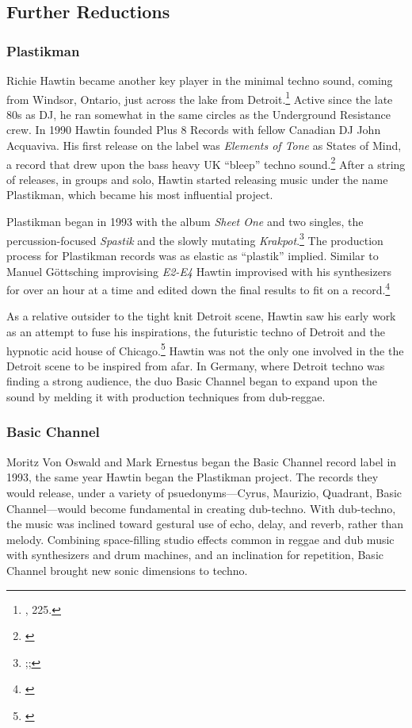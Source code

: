 \documentclass[12pt,twoside]{reedthesis}
\begin{document}
\subsection{Further Reductions}

\subsubsection{Plastikman}

Richie Hawtin became another key player in the minimal techno sound, coming from Windsor, Ontario, just across the lake from Detroit.\footnote{\cite{reynoldsGenerationEcstasyWorld1998}, 225.} Active since the late 80s as DJ, he ran somewhat in the same circles as the Underground Resistance crew. In 1990 Hawtin founded Plus 8 Records with fellow Canadian DJ John Acquaviva. His first release on the label was \emph{Elements of Tone} as States of Mind, a record that drew upon the bass heavy UK ``bleep'' techno sound.\footnote{\cite{statesofmindElementsTone1990}} After a string of releases, in groups and solo, Hawtin started releasing music under the name Plastikman, which became his most influential project.

Plastikman began in 1993 with the album \emph{Sheet One} and two singles, the percussion-focused \emph{Spastik} and the slowly mutating \emph{Krakpot}.\footnote{\cite{plastikmanSheetOne1993};\cite{plastikmanSpastik1993};\cite{plastikmanKrakpot1993}} The production process for Plastikman records was as elastic as ``plastik'' implied. Similar to Manuel G{\"o}ttsching improvising \emph{E2-E4} Hawtin improvised with his synthesizers for over an hour at a time and edited down the final results to fit on a record.\footnote{\cite{burnsRichieHawtinLecture2013}} 

As a relative outsider to the tight knit Detroit scene, Hawtin saw his early work as an attempt to fuse his inspirations, the futuristic techno of Detroit and the hypnotic acid house of Chicago.\footnote{\cite{burnsRichieHawtinLecture2013}} Hawtin was not the only one involved in the the Detroit scene to be inspired from afar. In Germany, where Detroit techno was finding a strong audience, the duo Basic Channel began to expand upon the sound by melding it with production techniques from dub-reggae.

\subsubsection{Basic Channel}
Moritz Von Oswald and Mark Ernestus began the Basic Channel record label in 1993, the same year Hawtin began the Plastikman project. The records they would release, under a variety of psuedonyms---Cyrus, Maurizio, Quadrant, Basic Channel---would become fundamental in creating dub-techno. With dub-techno, the music was inclined toward gestural use of echo, delay, and reverb, rather than melody. Combining space-filling studio effects common in reggae and dub music with synthesizers and drum machines, and an inclination for repetition, Basic Channel brought new sonic dimensions to techno.
\end{document}
